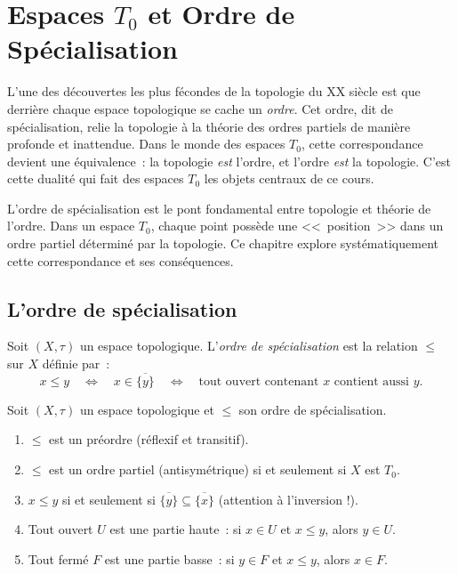 \chapter{Espaces $T_0$ et Ordre de Sp\'ecialisation}
\label{ch:t0_ordre}

L'une des d\'ecouvertes les plus f\'econdes de la topologie du XX\ieme{}
si\`ecle est que derri\`ere chaque espace topologique se cache un
\emph{ordre}. Cet ordre, dit \og de sp\'ecialisation\fg, relie la topologie
\`a la th\'eorie des ordres partiels de mani\`ere profonde et inattendue.
Dans le monde des espaces $T_0$, cette correspondance devient une
\'equivalence~: la topologie \emph{est} l'ordre, et l'ordre \emph{est} la
topologie. C'est cette dualit\'e qui fait des espaces $T_0$ les objets
centraux de ce cours.

\begin{intuition}
L'ordre de sp\'ecialisation est le pont fondamental entre topologie et th\'eorie de l'ordre.
Dans un espace $T_0$, chaque point poss\`ede une <<~position~>> dans un ordre partiel
d\'etermin\'e par la topologie. Ce chapitre explore syst\'ematiquement cette correspondance
et ses cons\'equences.
\end{intuition}

\section{L'ordre de sp\'ecialisation}

\begin{definition}
Soit $(X,\tau)$ un espace topologique. L'\emph{ordre de sp\'ecialisation} est la relation
$\leq$ sur $X$ d\'efinie par~:
\[
  x \leq y \quad \Longleftrightarrow \quad x \in \overline{\{y\}}
  \quad \Longleftrightarrow \quad \text{tout ouvert contenant } x \text{ contient aussi } y.
\]
\end{definition}

\begin{proposition}
Soit $(X,\tau)$ un espace topologique et $\leq$ son ordre de sp\'ecialisation.
\begin{enumerate}
  \item $\leq$ est un pr\'eordre (r\'eflexif et transitif).
  \item $\leq$ est un ordre partiel (antisym\'etrique) si et seulement si $X$ est $T_0$.
  \item $x \leq y$ si et seulement si $\overline{\{y\}} \subseteq \overline{\{x\}}$
    (attention \`a l'inversion !).
  \item Tout ouvert $U$ est une partie haute~: si $x \in U$ et $x \leq y$, alors $y \in U$.
  \item Tout ferm\'e $F$ est une partie basse~: si $y \in F$ et $x \leq y$, alors $x \in F$.
\end{enumerate}
\end{proposition}

